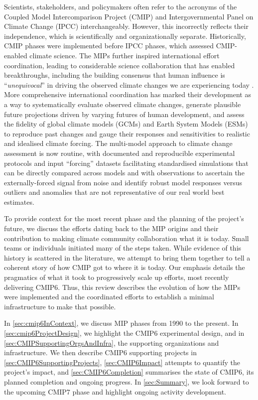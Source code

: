 \documentclass[manuscript]{copernicus}
\begin{document}
Scientists, stakeholders, and policymakers often refer to the acronyms of the Coupled Model Intercomparison Project (CMIP) and Intergovernmental Panel on Climate Change (IPCC) interchangeably. However, this incorrectly reflects their independence, which is scientifically and organizationally separate. Historically, CMIP phases were implemented before IPCC phases, which assessed CMIP-enabled climate science. The MIPs further inspired international effort coordination, leading to considerable science collaboration that has enabled breakthroughs, including the building consensus that human influence is ``\textit{unequivocal}'' in driving the observed climate changes we are experiencing today \citep[see \autoref{fig:fig6-MIPImpact};][]{eyring_human_2021}. More comprehensive international coordination has marked their development as a way to systematically evaluate observed climate changes, generate plausible future projections driven by varying futures of human development, and assess the fidelity of global climate models (GCMs) and Earth System Models (ESMs) to reproduce past changes and gauge their responses and sensitivities to realistic and idealised climate forcing. The multi-model approach to climate change assessment is now routine, with documented and reproducible experimental protocols and input ``forcing'' datasets facilitating standardised simulations that can be directly compared across models and with observations to ascertain the externally-forced signal from noise and identify robust model responses versus outliers and anomalies that are not representative of our real world best estimates.

To provide context for the most recent phase \citep[CMIP6;][]{eyring_overview_2016} and the planning of the project’s future, we discuss the efforts dating back to the MIP origins and their contribution to making climate community collaboration what it is today. Small teams or individuals initiated many of the steps taken. While evidence of this history is scattered in the literature, we attempt to bring them together to tell a coherent story of how CMIP got to where it is today. Our emphasis details the pragmatics of what it took to progressively scale up efforts, most recently delivering CMIP6. Thus, this review describes the evolution of how the MIPs were implemented and the coordinated efforts to establish a minimal infrastructure to make that possible.

In \autoref{sec:cmip6InContext}, we discuss MIP phases from 1990 to the present. In \autoref{sec:cmip6ProjectDesign}, we highlight the CMIP6 experimental design, and in \autoref{sec:CMIPSupportingOrgsAndInfra}, the supporting organizations and infrastructure. We then describe CMIP6 supporting projects in \autoref{sec:CMIP6SupportingProjects}, \autoref{sec:CMIP6Impact} attempts to quantify the project's impact, and \autoref{sec:CMIP6Completion} summarises the state of CMIP6, its planned completion and ongoing progress. In \autoref{sec:Summary}, we look forward to the upcoming CMIP7 phase and highlight ongoing activity development.
\end{document}
